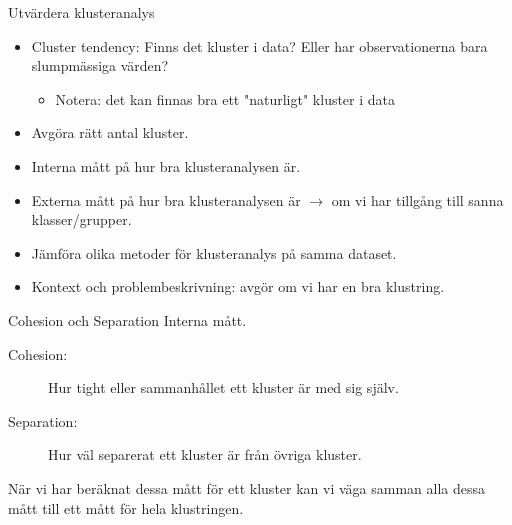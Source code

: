 \documentclass[10pt,english]{beamer}
\begin{document}
\begin{frame}{Utvärdera klusteranalys}

    \begin{itemize}
        \item Cluster tendency: Finns det kluster i data? Eller har observationerna bara slumpmässiga värden?
        \begin{itemize}
           \item Notera: det kan finnas bra ett "naturligt" kluster i data
        \end{itemize}
        \item Avgöra rätt antal kluster.
        \item Interna mått på hur bra klusteranalysen är.
        \item Externa mått på hur bra klusteranalysen är $\rightarrow$ om vi har tillgång till sanna klasser/grupper.
        \item Jämföra olika metoder för klusteranalys på samma dataset.
        \item Kontext och problembeskrivning: avgör om vi har en bra klustring.
    \end{itemize}
    
\end{frame}

\begin{frame}{Cohesion och Separation}
    Interna mått.
    \begin{description}
        \item[Cohesion:] Hur tight eller sammanhållet ett kluster är med sig själv.
        \item[Separation:] Hur väl separerat ett kluster är från övriga kluster.
    \end{description}
    
    När vi har beräknat dessa mått för ett kluster kan vi väga samman alla dessa mått till ett mått för hela klustringen.

\end{frame}
\end{document}
